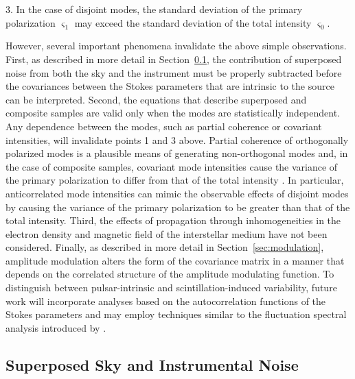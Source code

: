 \documentclass[twocolumn]{aastex6}
\newcommand{\Sec}[1]{Section~\ref{sec:#1}}
\begin{document}
3. In the case of disjoint modes, the standard deviation of the
primary polarization $\varsigma_1$ may exceed the standard deviation
of the total intensity $\varsigma_0$.

However, several important phenomena invalidate the above simple observations.
%
First, as described in more detail in \Sec{noise}, the contribution
of superposed noise from both the sky and the instrument must be
properly subtracted before the covariances between the Stokes
parameters that are intrinsic to the source can be interpreted.
%
Second, the equations that describe superposed and composite
samples are valid only when the modes are statistically independent.
Any dependence between the modes, such as partial coherence or
covariant intensities, will invalidate points 1 and 3 above.
%
Partial coherence of orthogonally polarized modes
\citep[e.g.][]{gan97} is a plausible means of generating
non-orthogonal modes and, in the case of composite samples, covariant mode
intensities cause the variance of the primary polarization to differ
from that of the total intensity \citep[e.g.][]{ms98}.
%
In particular, anticorrelated mode intensities can mimic the
observable effects of disjoint modes by causing the variance of the
primary polarization to be greater than that of the total intensity.
%
Third, the effects of propagation through inhomogeneities in the
electron density \citep[e.g.][]{cbh+04} and magnetic field
\citep[e.g.][]{mm98} of the interstellar medium have not been
considered.  
%
Finally, as described in more detail in \Sec{modulation}, amplitude
modulation alters the form of the covariance matrix in a manner that
depends on the correlated structure of the amplitude modulating
function.
%
To distinguish between pulsar-intrinsic and scintillation-induced
variability, future work will incorporate analyses based on the
autocorrelation functions of the Stokes parameters
\cite[e.g.][]{ch77,cbh+04} and may employ techniques similar to the
fluctuation spectral analysis introduced by \citet{es03,edw04,es04}.
%


\subsection{Superposed Sky and Instrumental Noise}
\label{sec:noise}
\end{document}
